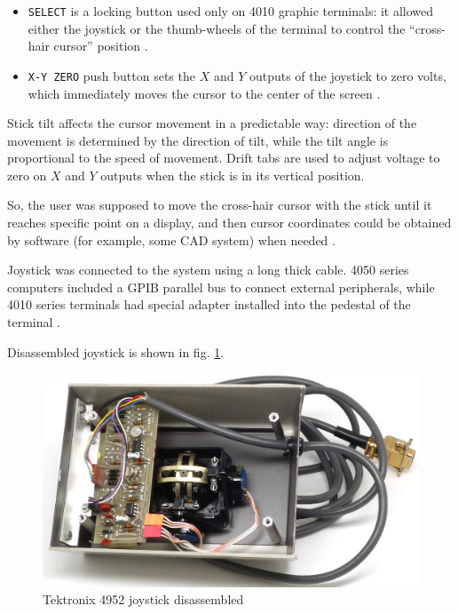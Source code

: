 \documentclass[11pt, a4paper]{article}
\begin{document}
\begin{itemize}
\item \verb!SELECT! is a locking button used only on 4010 graphic terminals: it allowed either the joystick or the thumb-wheels of the terminal to control the ``cross-hair cursor'' position \cite{manual, manual2}. 

\item \verb!X-Y ZERO! push button sets the $X$ and $Y$ outputs of the joystick to zero volts, which immediately moves the cursor to the center of the screen \cite{manual}.
\end{itemize}

Stick tilt affects the cursor movement in a predictable way: direction of the movement is determined by the direction of tilt, while the tilt angle is proportional to the speed of movement. Drift tabs are used to adjust voltage to zero on $X$ and $Y$ outputs when the stick is in its vertical position.

So, the user was supposed to move the cross-hair cursor with the stick until it reaches specific point on a display, and then  cursor coordinates could be obtained by software (for example, some CAD system) when needed \cite{price}.

Joystick was connected to the system using a long thick cable. 4050 series computers included a GPIB parallel bus to connect external peripherals, while 4010 series terminals had special adapter installed into the pedestal of the terminal \cite{manual, manual2}. 

Disassembled joystick is shown in fig. \ref{fig:TektronixJoystickInside}. 

\begin{figure}[h]
    \centering
    \includegraphics[scale=0.8]{1975_Tektronix_4952_Joystick/inside_30.jpg}
    \caption{Tektronix 4952 joystick disassembled}
    \label{fig:TektronixJoystickInside}
\end{figure}
\end{document}
